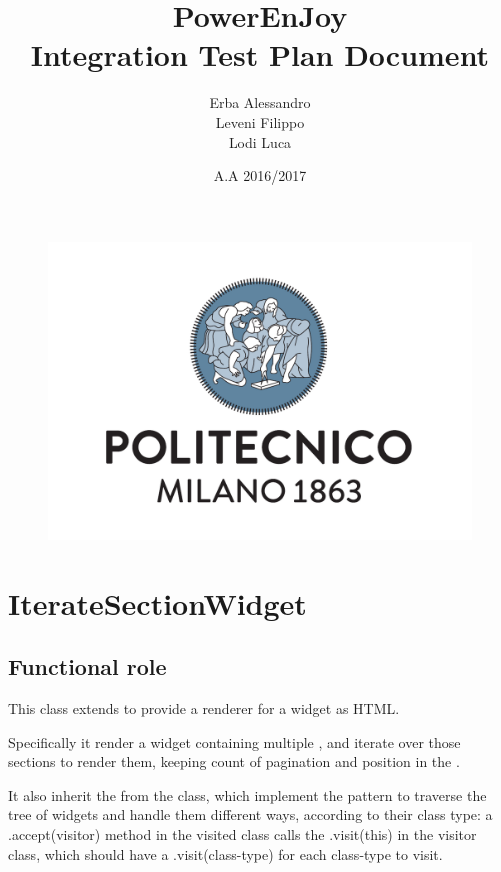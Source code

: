 \documentclass[english]{article}
\begin{document}
\lstset{language=Java} 

	\begin{figure}
		\centering
		\includegraphics[scale=0.5]{logo.pdf} 
	\end{figure}


	\title{PowerEnJoy\\
	Integration Test Plan Document\\
	}

	\date{A.A 2016/2017}
	
	\author{Erba Alessandro\\
	 Leveni Filippo\\
	 Lodi Luca}
	
	\maketitle
	\pagebreak{}
	\tableofcontents{} \pagebreak{}
	
\section{IterateSectionWidget}
	\subsection{Functional role}
	
	This class extends  to provide a renderer for a widget as HTML. 
	\par Specifically it render a widget containing multiple , and iterate over those sections to render them, keeping count of pagination and position in the .
	\par It also inherit the  from  the  class, which implement the   pattern to traverse the tree of widgets and handle them different ways, according to their class type:
	a .accept(visitor) method in the visited class calls the .visit(this) in the visitor class, which should have a .visit(class-type) for each class-type to visit.
	
\end{document}
